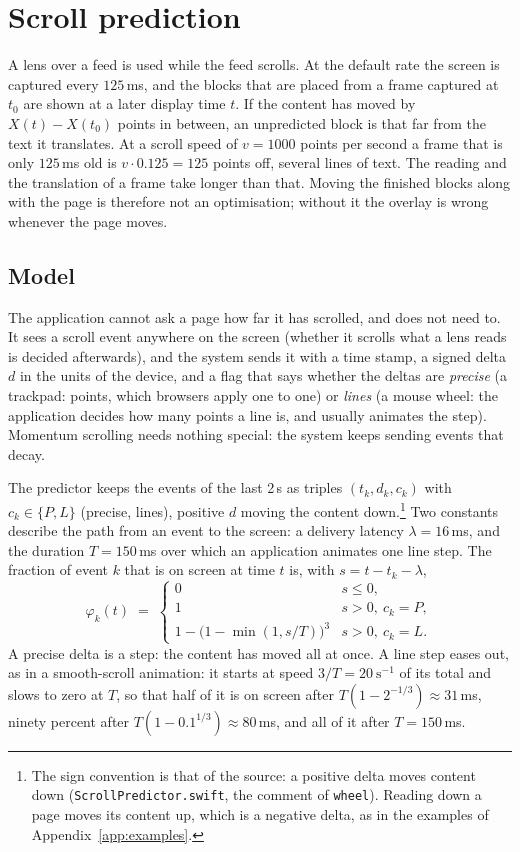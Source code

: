 \section{Scroll prediction}\label{sec:scroll}

A lens over a feed is used while the feed scrolls. At the default rate the screen is captured every $125$\,ms, and the blocks that
are placed from a frame captured at $t_0$ are shown at a later display time $t$. If the content has moved by $X(t)-X(t_0)$
points in between, an unpredicted block is that far from the text it translates. At a scroll speed of $v=1000$ points per second a
frame that is only $125$\,ms old is $v\cdot0.125=125$ points off, several lines of text. The reading and the translation of a
frame take longer than that. Moving the finished blocks along with the page is therefore not an optimisation; without it the
overlay is wrong whenever the page moves.

\subsection{Model}

The application cannot ask a page how far it has scrolled, and does not need to. It sees a scroll event anywhere on the screen
(whether it scrolls what a lens reads is decided afterwards), and the system sends it with a time stamp, a signed delta $d$ in the units of the device, and a flag
that says whether the deltas are \emph{precise} (a trackpad: points, which browsers apply one to one) or \emph{lines} (a mouse wheel:
the application decides how many points a line is, and usually animates the step). Momentum scrolling needs nothing special: the
system keeps sending events that decay.

The predictor keeps the events of the last 2\,s as triples $(t_k,d_k,c_k)$ with $c_k\in\{P,L\}$ (precise, lines), positive $d$
moving the content down.\footnote{The sign convention is that of the source: a positive delta moves content down (\texttt{ScrollPredictor.swift}, the comment of \texttt{wheel}). Reading down a page moves its content up, which is a negative delta, as in the examples of Appendix~\ref{app:examples}.} Two constants describe the path from an event to the screen: a delivery latency $\lambda=16$\,ms,
and the duration $T=150$\,ms over which an application animates one line step. The fraction of event $k$ that is on screen at time $t$ is,
with $s=t-t_k-\lambda$,
\begin{equation}\label{eq:shown}
\varphi_k(t)\;=\;\begin{cases}
0 & s\le0,\\
1 & s>0,\ c_k=P,\\
1-\bigl(1-\min(1,s/T)\bigr)^3 & s>0,\ c_k=L.
\end{cases}
\end{equation}
A precise delta is a step: the content has moved all at once. A line step eases out, as in a smooth-scroll animation: it starts at
speed $3/T=20\ \mathrm{s}^{-1}$ of its total and slows to zero at $T$, so that half of it is on screen after $T(1-2^{-1/3})\approx31$\,ms, ninety percent
after $T(1-0.1^{1/3})\approx80$\,ms, and all of it after $T=150$\,ms.

